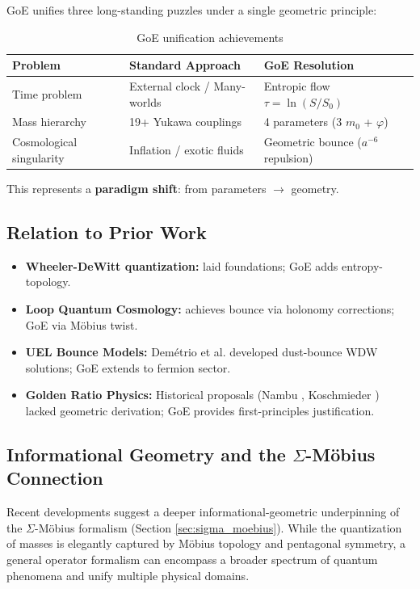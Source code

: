 \documentclass[12pt]{article}
\begin{document}
GoE unifies three long-standing puzzles under a single geometric principle:

\begin{table}[H]
\centering
\caption{GoE unification achievements}
\small
\begin{tabular}{p{3.5cm}p{4cm}p{4.5cm}}
\toprule
\textbf{Problem} & \textbf{Standard Approach} & \textbf{GoE Resolution} \\
\midrule
Time problem & External clock / Many-worlds & Entropic flow $\tau = \ln(S/S_0)$ \\
Mass hierarchy & 19+ Yukawa couplings & 4 parameters (3 $m_0$ + $\varphi$) \\
Cosmological singularity & Inflation / exotic fluids & Geometric bounce ($a^{-6}$ repulsion) \\
\bottomrule
\end{tabular}
\end{table}

This represents a \textbf{paradigm shift}: from parameters $\to$ geometry.

\subsection{Relation to Prior Work}

\begin{itemize}
\item \textbf{Wheeler-DeWitt quantization:} \cite{wheeler1968,dewitt1967} laid foundations; GoE adds entropy-topology.
\item \textbf{Loop Quantum Cosmology:} \cite{ashtekar2006,kisielowski2022} achieves bounce via holonomy corrections; GoE via M\"obius twist.
\item \textbf{UEL Bounce Models:} Demétrio et al. \cite{barroso2024,demetrio2025} developed dust-bounce WDW solutions; GoE extends to fermion sector.
\item \textbf{Golden Ratio Physics:} Historical proposals (Nambu \cite{nambu1960}, Koschmieder \cite{koschmieder1986}) lacked geometric derivation; GoE provides first-principles justification.
\end{itemize}

\subsection{Informational Geometry and the $\Sigma$-M\"obius Connection}
\label{sec:sigma_moebius_info}

Recent developments suggest a deeper informational-geometric underpinning of the $\Sigma$-M\"obius formalism (Section \ref{sec:sigma_moebius}). While the quantization of masses is elegantly captured by M\"obius topology and pentagonal symmetry, a general operator formalism can encompass a broader spectrum of quantum phenomena and unify multiple physical domains.
\end{document}
